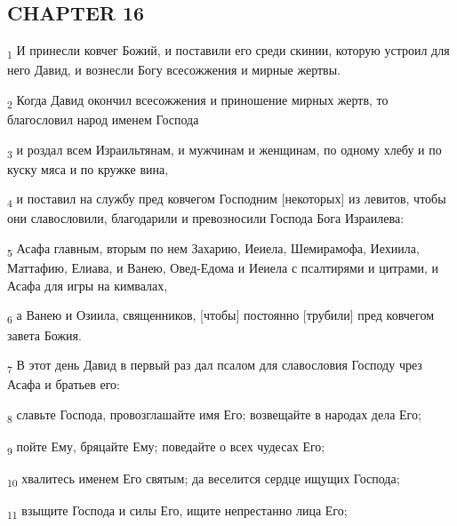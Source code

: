 \subsection{CHAPTER 16}
\begin{tcolorbox}
\textsubscript{1} И принесли ковчег Божий, и поставили его среди скинии, которую устроил для него Давид, и вознесли Богу всесожжения и мирные жертвы.
\end{tcolorbox}
\begin{tcolorbox}
\textsubscript{2} Когда Давид окончил всесожжения и приношение мирных жертв, то благословил народ именем Господа
\end{tcolorbox}
\begin{tcolorbox}
\textsubscript{3} и роздал всем Израильтянам, и мужчинам и женщинам, по одному хлебу и по куску мяса и по кружке вина,
\end{tcolorbox}
\begin{tcolorbox}
\textsubscript{4} и поставил на службу пред ковчегом Господним [некоторых] из левитов, чтобы они славословили, благодарили и превозносили Господа Бога Израилева:
\end{tcolorbox}
\begin{tcolorbox}
\textsubscript{5} Асафа главным, вторым по нем Захарию, Иеиела, Шемирамофа, Иехиила, Маттафию, Елиава, и Ванею, Овед-Едома и Иеиела с псалтирями и цитрами, и Асафа для игры на кимвалах,
\end{tcolorbox}
\begin{tcolorbox}
\textsubscript{6} а Ванею и Озиила, священников, [чтобы] постоянно [трубили] пред ковчегом завета Божия.
\end{tcolorbox}
\begin{tcolorbox}
\textsubscript{7} В этот день Давид в первый раз дал псалом для славословия Господу чрез Асафа и братьев его:
\end{tcolorbox}
\begin{tcolorbox}
\textsubscript{8} славьте Господа, провозглашайте имя Его; возвещайте в народах дела Его;
\end{tcolorbox}
\begin{tcolorbox}
\textsubscript{9} пойте Ему, бряцайте Ему; поведайте о всех чудесах Его;
\end{tcolorbox}
\begin{tcolorbox}
\textsubscript{10} хвалитесь именем Его святым; да веселится сердце ищущих Господа;
\end{tcolorbox}
\begin{tcolorbox}
\textsubscript{11} взыщите Господа и силы Его, ищите непрестанно лица Его;
\end{tcolorbox}
